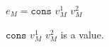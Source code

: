 \begin{case}

$e_{M}=\mathtt{cons}$ $v_{M}^{1}$ $v_{M}^{2}$

$\mathtt{cons}$ $v_{M}^{1}$ $v_{M}^{2}$ is a value.

\end{case}
